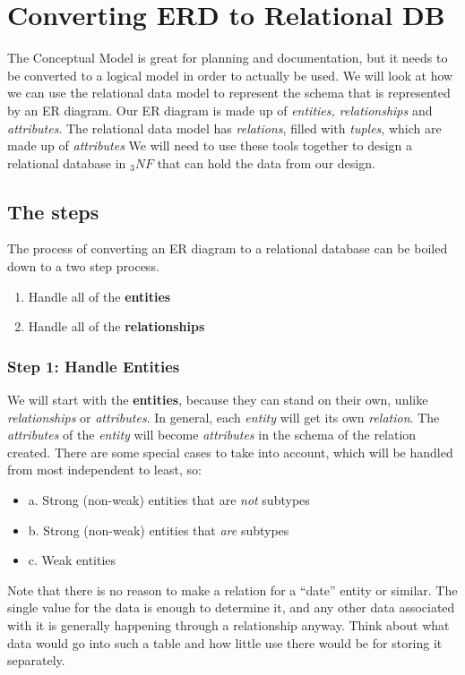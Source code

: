 \documentclass{report}
\begin{document}
            \chapter{Converting ERD to Relational DB}
            \newpage
\noindent            The Conceptual Model is great for planning and documentation, but it needs to be converted to a logical model in order to actually be used.
            We will look at how we can use the relational data model to represent the schema that is represented by an ER diagram.
\bigbreak \noindent
Our ER diagram is made up of \textit{entities, relationships} and \textit{attributes}. 
\bigbreak \noindent
The relational data model has \textit{relations}, filled with \textit{tuples}, which are made up of \textit{attributes}
\bigbreak \noindent
We will need to use these tools together to design a relational database in $_3NF$ that can hold the data from our design.
\section{The steps}
The process of converting an ER diagram to a relational database can be boiled  down to a two step process.
\begin{enumerate}
    \item Handle all of the \textbf{entities} 
    \item Handle all of the \textbf{relationships}
\end{enumerate}
\subsection{Step 1: Handle Entities}
We will start with the \textbf{entities}, because they can stand on their own, unlike \textit{relationships} or \textit{attributes}.
\bigbreak \noindent
In general, each \textit{entity} will get its own \textit{relation}. The \textit{attributes} of the \textit{entity} will become \textit{attributes} in the schema of the relation created. There are some special cases to take into account, which will be handled from most independent to least, so:
\begin{itemize}
    \item a. Strong (non-weak) entities that are \textit{not} subtypes
    \item b. Strong (non-weak) entities that \textit{are} subtypes
    \item c. Weak entities
\end{itemize}
Note that there is no reason to make a relation for a ``date'' entity or similar. The single value for the data is enough to determine it, and any other data associated with it is generally happening through a relationship anyway. Think about what data would go into such a table and how little use there would be for storing it separately.
\bigbreak \noindent
\end{document}
